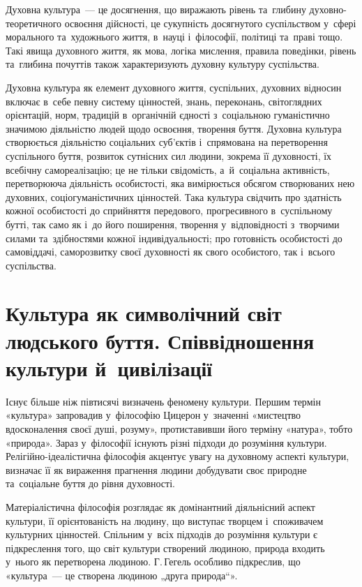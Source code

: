 \documentclass[a5paper,oneside,DIV=12,12pt,headings=small]{scrartcl}
\begin{document}
		Духовна культура~— це досягнення, що виражають рівень та~глибину духовно-теоретичного освоєння дійсності, це сукупність досягнутого суспільством у~сфері морального та~художнього життя, в~науці і~філософії, політиці та~праві тощо. Такі явища духовного життя, як мова, логіка мислення, правила поведінки, рівень та~глибина почуттів також характеризують духовну культуру суспільства.
		
		Духовна культура як елемент духовного життя, суспільних, духовних відносин включає в~себе певну систему цінностей, знань, переконань, світоглядних орієнтацій, норм, традицій в~органічній єдності з~соціальною гуманістично значимою діяльністю людей щодо освоєння, творення буття. Духовна культура створюється діяльністю соціальних суб'\-єктів і~спрямована на перетворення суспільного буття, розвиток сутнісних сил людини, зокрема її духовності, їх всебічну самореалізацію; це не тільки свідомість, а~й~соціальна активність,  перетворююча діяльність особистості, яка вимірюється обсягом створюваних нею духовних, соціогуманістичних цінностей. Така культура свідчить про здатність кожної особистості до сприйняття передового, прогресивного в~суспільному бутті, так само як і~до його поширення, творення у~відповідності з~творчими силами та~здібностями кожної індивідуальності; про готовність особистості до самовіддачі, саморозвитку своєї духовності як свого особистого, так і~всього суспільства.
		
	\section{Культура як символічний світ людського буття. Співвідношення культури й~цивілізації}

		Існує більше ніж  півтисячі визначень феномену культури.  Першим  термін «культура» запровадив у~філософію Цицерон у~значенні «мистецтво вдосконалення своєї душі, розуму», протиставивши його терміну «натура», тобто «природа». Зараз у~філософії існують різні підходи до розуміння культури. Релігійно-ідеалістична філософія акцентує увагу на духовному аспекті культури, визначає її як вираження прагнення людини добудувати своє природне та~соціальне буття до  рівня духовності.
		
		Матеріалістична філософія розглядає  як домінантний діяльнісний аспект культури, її орієнтованість на людину, що виступає творцем і~споживачем культурних цінностей. Спільним у~всіх підходів до  розуміння культури є підкреслення того, що світ культури створений людиною, природа входить у~нього як перетворена людиною. Г.\,Гегель  особливо підкреслив, що «культура~— це створена людиною „друга природа“». 
		
\end{document}
